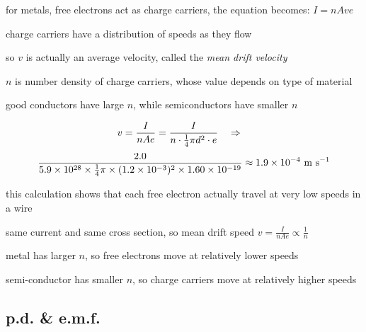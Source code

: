 \cmt for metals, free electrons act as charge carriers, the equation becomes: $I = nAve$

\cmt charge carriers have a distribution of speeds as they flow

so $v$ is actually an average velocity, called the \emph{mean drift velocity}

\cmt $n$ is number density of charge carriers, whose value depends on type of material

good conductors have large $n$, while semiconductors have smaller $n$



\begin{soln}\begin{equation*}
v = \frac{I}{nAe} = \frac{I}{n\cdot\frac{1}{4} \pi d^2 \cdot e} \quad \Rightarrow \quad \end{equation*}
\begin{equation*}\frac{2.0}{5.9\times10^{28} \times \frac{1}{4}\pi \times (1.2\times10^{-3})^2\times1.60\times10^{-19}} \approx 1.9\times10^{-4} \text{ m s$^{-1}$}
\end{equation*}

\eqyskip this calculation shows that each free electron actually travel at very low speeds in a wire \end{soln}


\begin{soln}
    
same current and same cross section, so mean drift speed $ v = \frac{I}{nAe} \propto \frac{1}{n}$

metal has larger $n$, so free electrons move at relatively lower speeds

semi-conductor has smaller $n$, so charge carriers move at relatively higher speeds \end{soln}




\subsection{p.d. \& e.m.f.}\label{ch:potential-difference}

